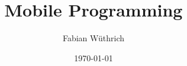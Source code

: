 \titlehead{Hochschule Luzern \\ 
	Technik \& Architektur}
\subject{Zusammenfassung}
\title{Mobile Programming}
\subtitle{}
\author{Fabian Wüthrich}
\date{\today}

\maketitle